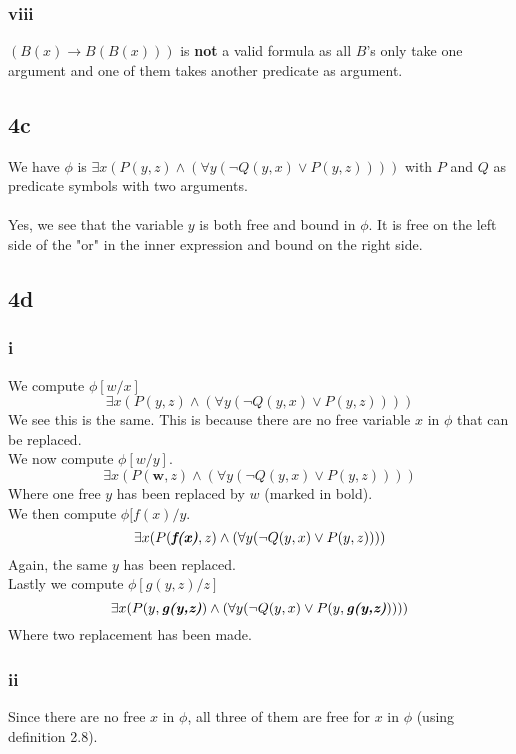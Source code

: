 \documentclass[12pt]{article}
\begin{document}
\subsubsection*{viii}
$(B(x)\to B(B(x)))$ is \textbf{not} a valid formula as all $B$'s only take one argument and one of them takes another predicate as argument.

\subsection*{4c}
We have $\phi$ is $\exists x(P(y,z)\land (\forall y(\neg Q(y,x)\lor P(y,z))))$ with $P$ and $Q$ as predicate symbols with two arguments.\\
\\
Yes, we see that the variable $y$ is both free and bound in $\phi$. It is free on the left side of the "or" in the inner expression and bound on the right side.

\subsection*{4d}
\subsubsection*{i}
We compute $\phi [w/x]$\\
$$\exists x(P(y,z)\land (\forall y(\neg Q(y,x)\lor P(y,z))))$$
We see this is the same. This is because there are no free variable $x$ in $\phi$ that can be replaced.\\
We now compute $\phi [w/y]$.\\
$$\exists x(P(\textbf{w},z)\land (\forall y(\neg Q(y,x)\lor P(y,z))))$$
Where one free $y$ has been replaced by $w$ (marked in bold).\\
We then compute $\phi [f(x)/y$.\\
$$\exists x(P(\textit{\textbf{f(x)}},z)\land (\forall y(\neg Q(y,x)\lor P(y,z))))$$
Again, the same $y$ has been replaced.\\
Lastly we compute $\phi [g(y,z)/z]$\\
$$\exists x(P(y,\textit{\textbf{g(y,z)}})\land (\forall y(\neg Q(y,x)\lor P(y,\textit{\textbf{g(y,z)}}))))$$
Where two replacement has been made.

\subsubsection*{ii}
Since there are no free $x$ in $\phi$, all three of them are free for $x$ in $\phi$ (using definition 2.8).
\end{document}
